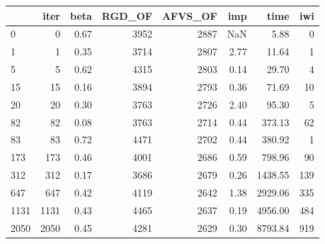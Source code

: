 \begin{tabular}{lrrrrrrr}
\toprule
{} &  iter &  beta &  RGD\_OF &  AFVS\_OF &  imp &    time &  iwi \\
\midrule
0    &     0 &  0.67 &    3952 &     2887 &  NaN &    5.88 &    0 \\
1    &     1 &  0.35 &    3714 &     2807 & 2.77 &   11.64 &    1 \\
5    &     5 &  0.62 &    4315 &     2803 & 0.14 &   29.70 &    4 \\
15   &    15 &  0.16 &    3894 &     2793 & 0.36 &   71.69 &   10 \\
20   &    20 &  0.30 &    3763 &     2726 & 2.40 &   95.30 &    5 \\
82   &    82 &  0.08 &    3763 &     2714 & 0.44 &  373.13 &   62 \\
83   &    83 &  0.72 &    4471 &     2702 & 0.44 &  380.92 &    1 \\
173  &   173 &  0.46 &    4001 &     2686 & 0.59 &  798.96 &   90 \\
312  &   312 &  0.17 &    3686 &     2679 & 0.26 & 1438.55 &  139 \\
647  &   647 &  0.42 &    4119 &     2642 & 1.38 & 2929.06 &  335 \\
1131 &  1131 &  0.43 &    4465 &     2637 & 0.19 & 4956.00 &  484 \\
2050 &  2050 &  0.45 &    4281 &     2629 & 0.30 & 8793.84 &  919 \\
\bottomrule
\end{tabular}
